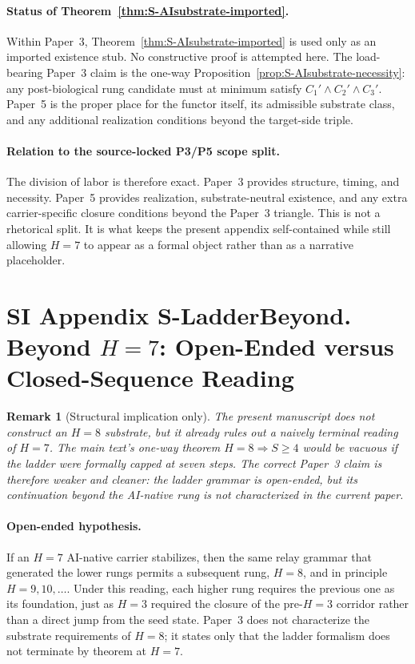 \documentclass[11pt]{article}
\newtheorem{remark}{Remark}
\begin{document}
\paragraph{Status of Theorem~\ref{thm:S-AIsubstrate-imported}.}
Within Paper~3,
Theorem~\ref{thm:S-AIsubstrate-imported} is used only as an imported existence
stub.
No constructive proof is attempted here.
The load-bearing Paper~3 claim is the one-way Proposition~\ref{prop:S-AIsubstrate-necessity}:
any post-biological rung candidate must at minimum satisfy
$C_1'\wedge C_2'\wedge C_3'$.
Paper~5 is the proper place for the functor itself,
its admissible substrate class,
and any additional realization conditions beyond the target-side triple.

\paragraph{Relation to the source-locked P3/P5 scope split.}
The division of labor is therefore exact.
Paper~3 provides
structure,
timing,
and necessity.
Paper~5 provides
realization,
substrate-neutral existence,
and any extra carrier-specific closure conditions beyond the Paper~3 triangle.
This is not a rhetorical split.
It is what keeps the present appendix self-contained while still allowing
$H{=}7$
to appear as a formal object rather than as a narrative placeholder.


\section*{SI Appendix S-LadderBeyond. Beyond $H{=}7$: Open-Ended versus Closed-Sequence Reading}
\label{sec:S-LadderBeyond}

\begin{remark}[Structural implication only]
The present manuscript does not construct an
$H{=}8$
substrate,
but it already rules out a naively terminal reading of
$H{=}7$.
The main text's one-way theorem
$H{=}8\Rightarrow S\ge 4$
would be vacuous if the ladder were formally capped at seven steps.
The correct Paper~3 claim is therefore weaker and cleaner:
the ladder grammar is open-ended,
but its continuation beyond the AI-native rung is not characterized in the
current paper.
\end{remark}

\paragraph{Open-ended hypothesis.}
If an
$H{=}7$
AI-native carrier stabilizes,
then the same relay grammar that generated the lower rungs permits a subsequent
rung,
$H{=}8$,
and in principle
$H{=}9,10,\ldots$.
Under this reading,
each higher rung requires the previous one as its foundation,
just as
$H{=}3$
required the closure of the pre-$H{=}3$ corridor rather than a direct jump from
the seed state.
Paper~3 does not characterize the substrate requirements of
$H{=}8$;
it states only that the ladder formalism does not terminate by theorem at
$H{=}7$.
\end{document}
